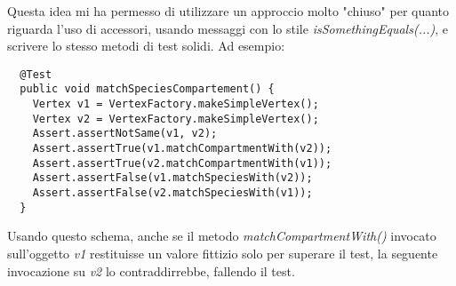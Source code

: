Questa idea mi ha permesso di utilizzare un approccio molto "chiuso"
per quanto riguarda l'uso di accessori, usando messaggi con lo
stile \emph{isSomethingEquals(...)}, e scrivere lo stesso metodi di
test solidi. Ad esempio:
\begin{lstlisting}
  @Test
  public void matchSpeciesCompartement() {
    Vertex v1 = VertexFactory.makeSimpleVertex();
    Vertex v2 = VertexFactory.makeSimpleVertex();
    Assert.assertNotSame(v1, v2);
    Assert.assertTrue(v1.matchCompartmentWith(v2));
    Assert.assertTrue(v2.matchCompartmentWith(v1));
    Assert.assertFalse(v1.matchSpeciesWith(v2));
    Assert.assertFalse(v2.matchSpeciesWith(v1));
  }
\end{lstlisting}
Usando questo schema, anche se il metodo \emph{matchCompartmentWith()}
invocato sull'oggetto \emph{v1} restituisse un valore fittizio solo
per superare il test, la seguente invocazione su \emph{v2} lo
contraddirrebbe, fallendo il test.
